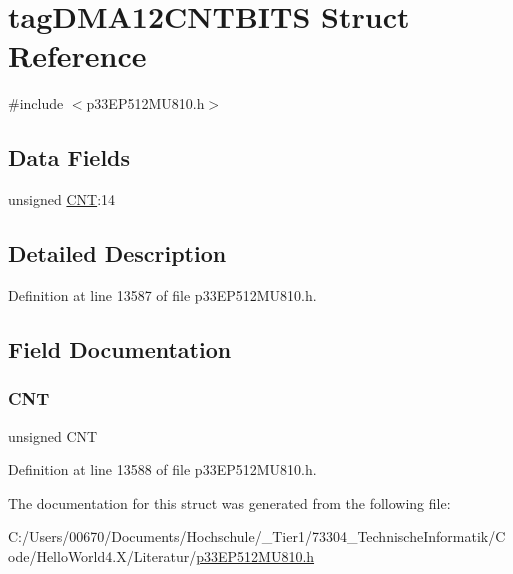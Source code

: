 \hypertarget{structtag_d_m_a12_c_n_t_b_i_t_s}{}\section{tag\+D\+M\+A12\+C\+N\+T\+B\+I\+TS Struct Reference}
\label{structtag_d_m_a12_c_n_t_b_i_t_s}


{\ttfamily \#include $<$p33\+E\+P512\+M\+U810.\+h$>$}

\subsection*{Data Fields}
\begin{DoxyCompactItemize}
\item 
unsigned \hyperlink{structtag_d_m_a12_c_n_t_b_i_t_s_a30be39d82c244f19fd98dd74227487f6}{C\+NT}\+:14
\end{DoxyCompactItemize}


\subsection{Detailed Description}


Definition at line 13587 of file p33\+E\+P512\+M\+U810.\+h.



\subsection{Field Documentation}
\mbox{\label{structtag_d_m_a12_c_n_t_b_i_t_s_a30be39d82c244f19fd98dd74227487f6}} 
\subsubsection{\texorpdfstring{C\+NT}{CNT}}
{\footnotesize\ttfamily unsigned C\+NT}



Definition at line 13588 of file p33\+E\+P512\+M\+U810.\+h.



The documentation for this struct was generated from the following file\+:\begin{DoxyCompactItemize}
\item 
C\+:/\+Users/00670/\+Documents/\+Hochschule/\+\_\+\+Tier1/73304\+\_\+\+Technische\+Informatik/\+Code/\+Hello\+World4.\+X/\+Literatur/\hyperlink{p33_e_p512_m_u810_8h}{p33\+E\+P512\+M\+U810.\+h}\end{DoxyCompactItemize}
